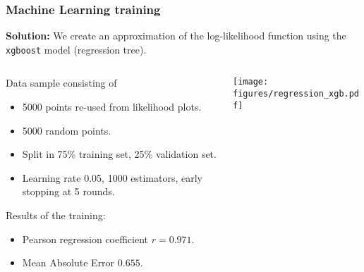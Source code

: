 \documentclass[mathserif, 10pt, dvipsnames]{beamer}
\begin{document}
\begin{frame}\frametitle{Machine Learning training}

    \textbf{Solution:} We create an approximation of the log-likelihood function using the \texttt{xgboost} model (regression tree).

    \begin{columns}
        \begin{column}{0.5\textwidth}
            Data sample consisting of
            \begin{itemize}
                \item 5000 points re-used from likelihood plots.
                \item 5000 random points.
                \item Split in 75\% training set, 25\% validation set.
                \item Learning rate 0.05, 1000 estimators, early stopping at 5 rounds.
            \end{itemize}
            Results of the training:
            \begin{itemize}
                \item Pearson regression coefficient $r=0.971$.
                \item Mean Absolute Error $0.655$.
            \end{itemize}
        \end{column}
        \begin{column}{0.5\textwidth}
            \texttt{[image: figures/regression\_xgb.pdf]}
        \end{column}
    \end{columns}

\end{frame}
\end{document}
